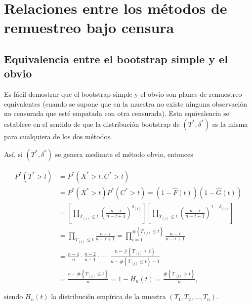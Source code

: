 \documentclass[
]{book}
\theoremstyle{break}
\theoremstyle{definition}
\theoremstyle{definition}
\theoremstyle{definition}
\theoremstyle{definition}
\theoremstyle{remark}
\begin{document}
\hypertarget{relaciones-entre-los-muxe9todos-de-remuestreo-bajo-censura}{%
\section{Relaciones entre los métodos de remuestreo bajo censura}\label{relaciones-entre-los-muxe9todos-de-remuestreo-bajo-censura}}

\hypertarget{equivalencia-entre-el-bootstrap-simple-y-el-obvio}{%
\subsection{Equivalencia entre el bootstrap simple y el obvio}\label{equivalencia-entre-el-bootstrap-simple-y-el-obvio}}

Es fácil demostrar que el bootstrap simple y el obvio son planes de
remuestreo equivalentes (cuando se supone que en la muestra no existe
ninguna observación no censurada que esté empatada con otra censurada).
Esta equivalencia se establece en el sentido de que la distribución
bootstrap de \(\left( T^{\ast},\delta^{\ast} \right)\) es la misma para
cualquiera de los dos métodos.

Así, si \(\left( T^{\ast},\delta^{\ast} \right)\) se genera mediante el
método obvio, entonces

\[\begin{aligned}
P^{\ast}\left( T^{\ast}>t \right) &= P^{\ast}\left( X^{\ast}>t,C^{\ast
}>t \right) \\
&= P^{\ast}\left( X^{\ast}>t \right) P^{\ast}\left( C^{\ast}>t \right)
=\left( 1-\hat{F}\left( t \right) \right) \left( 1-\hat{G}\left( t \right)
 \right) \\
&= \left[ \prod_{T_{(i)}\leq t}\left( \frac{n-i}{n-i+1} \right)
^{\delta _{(i)}}\right] \left[ \prod_{T_{(i)}\leq
t}\left( \frac{n-i}{n-i+1} \right)^{1-\delta _{(i)}}\right] \\
&= \prod_{T_{(i)}\leq t}\frac{n-i}{n-i+1}=\prod_{i=1}^{\#\left
\{ T_{(j)}\leq t\right\} }\frac{n-i}{n-i+1} \\
&= \frac{n-1}{n}\cdot \frac{n-2}{n-1}\cdot \cdots \cdot \frac{n-\#\left\{
T_{(j)}\leq t\right\} }{n-\#\left\{ T_{(j)}\leq
t\right\} +1} \\
&= \frac{n-\#\left\{ T_{(j)}\leq t\right\} }{n}=1-H_n\left(
t \right) =\frac{\#\left\{ T_{(j)}>t\right\} }{n},
\end{aligned}\]

siendo \(H_n\left( t \right)\) la distribución empírica de la muestra
\(\left( T_1,T_2,\ldots ,T_n \right)\).
\end{document}
